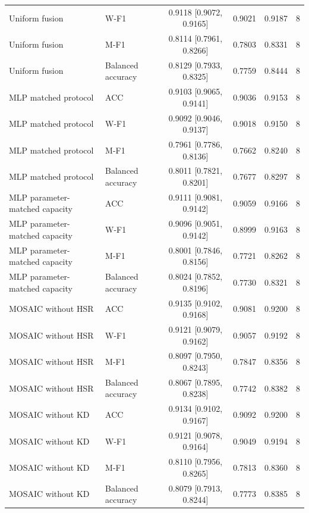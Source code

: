 \begin{tabular}{llcccc}
Uniform fusion & W-F1 & 0.9118 [0.9072, 0.9165] & 0.9021 & 0.9187 & 8 \\
Uniform fusion & M-F1 & 0.8114 [0.7961, 0.8266] & 0.7803 & 0.8331 & 8 \\
Uniform fusion & Balanced accuracy & 0.8129 [0.7933, 0.8325] & 0.7759 & 0.8444 & 8 \\
MLP matched protocol & ACC & 0.9103 [0.9065, 0.9141] & 0.9036 & 0.9153 & 8 \\
MLP matched protocol & W-F1 & 0.9092 [0.9046, 0.9137] & 0.9018 & 0.9150 & 8 \\
MLP matched protocol & M-F1 & 0.7961 [0.7786, 0.8136] & 0.7662 & 0.8240 & 8 \\
MLP matched protocol & Balanced accuracy & 0.8011 [0.7821, 0.8201] & 0.7677 & 0.8297 & 8 \\
MLP parameter-matched capacity & ACC & 0.9111 [0.9081, 0.9142] & 0.9059 & 0.9166 & 8 \\
MLP parameter-matched capacity & W-F1 & 0.9096 [0.9051, 0.9142] & 0.8999 & 0.9163 & 8 \\
MLP parameter-matched capacity & M-F1 & 0.8001 [0.7846, 0.8156] & 0.7721 & 0.8262 & 8 \\
MLP parameter-matched capacity & Balanced accuracy & 0.8024 [0.7852, 0.8196] & 0.7730 & 0.8321 & 8 \\
MOSAIC without HSR & ACC & 0.9135 [0.9102, 0.9168] & 0.9081 & 0.9200 & 8 \\
MOSAIC without HSR & W-F1 & 0.9121 [0.9079, 0.9162] & 0.9057 & 0.9192 & 8 \\
MOSAIC without HSR & M-F1 & 0.8097 [0.7950, 0.8243] & 0.7847 & 0.8356 & 8 \\
MOSAIC without HSR & Balanced accuracy & 0.8067 [0.7895, 0.8238] & 0.7742 & 0.8382 & 8 \\
MOSAIC without KD & ACC & 0.9134 [0.9102, 0.9167] & 0.9092 & 0.9200 & 8 \\
MOSAIC without KD & W-F1 & 0.9121 [0.9078, 0.9164] & 0.9049 & 0.9194 & 8 \\
MOSAIC without KD & M-F1 & 0.8110 [0.7956, 0.8265] & 0.7813 & 0.8360 & 8 \\
MOSAIC without KD & Balanced accuracy & 0.8079 [0.7913, 0.8244] & 0.7773 & 0.8385 & 8 \\
\bottomrule
\end{tabular}
